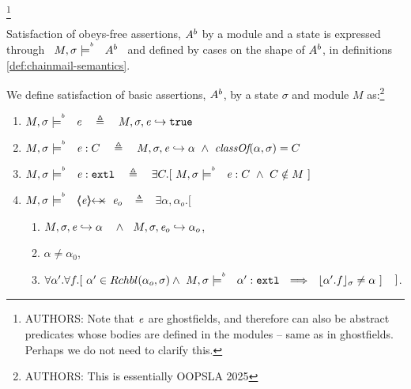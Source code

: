 \footnote{ AUTHORS:  
 Note that $\mathit{e}$ are ghostfields, and therefore can also be abstract predicates whose bodies are defined in the modules -- same as in ghostfields. 
 Perhaps we do not need to clarify this.
 }
 
 Satisfaction  of  obeys-free assertions, $A^{b}$ by a module and a state is expressed  through \ $M , \sigma \models^{^b}\ \ {{A^{b}}}$ \  and defined by cases on the shape of $A^{b}$, in definitions \ref{def:chainmail-semantics}.


\begin{definition} 
\label{def:chainmail-semantics}
\label{def:chainmail-protection-from}
\label{sect:semantics:assert:prtFrom}
 \label{def:chainmail-protection}
 We define satisfaction of basic assertions, $A^{b}$, by a %
state $\sigma$ and 
 module $M$ as:\footnote{AUTHORS: This is essentially OOPSLA 2025}
\begin{enumerate}
\item
\label{cExpr}
$\satisfiesAB{M}{\sigma}{{\re}}\ \ \ \triangleq \ \ \   \eval{M}{\sigma}{{\re}}{\true}$
\item
\label{cClass}
$\satisfiesAB{M}{\sigma}{{{\re}} : C}\ \ \ \triangleq \ \ \   \eval{M}{\sigma}{{\re}}{\alpha}\   \wedge \ \class{\alpha} {\sigma}= C$
\item
\label{cExternal}
$\satisfiesAB{M}{\sigma}{\external{{\re}}} \ \ \ \triangleq \ \ \  \exists C.[\ \satisfiesAB{M}{\sigma}{{{\re}} : C} \ \wedge \ C \notin M \ ]$
 
 \item
 \label{cProtected}
$\satisfiesAB{M}{\sigma}{\protectedFrom{{\re}} {{\re_{o}}}}$ $\ \  \triangleq\ \ $
$\exists \alpha, \alpha_{o}. [$ 
  \begin{enumerate}
 \item
 $ \eval{M}{\sigma}{{\re}}{\alpha}\ \ \ \wedge\ \ \eval{M}{\sigma}{{\re_o}}{\alpha_o}$,
  \item
$\alpha\neq \alpha_0$,
 \item
$\forall \alpha'.\forall f.[\ \alpha' \in {\ensuremath{Rchbl(\alpha_o,\sigma)}} \wedge\   M , \sigma \models^{^b}\ \ {\alpha':\mbox{\normalfont{\texttt{extl}}}} 
\ \ \Longrightarrow \ \  
  \lfloor \alpha'.f \rfloor_{\sigma} \neq \alpha     \ ] $  $  \strut \hspace{.25cm} ] $.
\end{enumerate}


\end{enumerate}
\end{definition}

